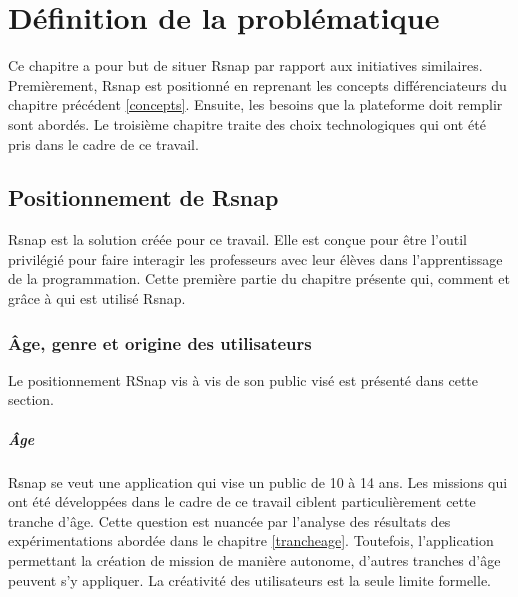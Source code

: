 \chapter{Définition de la problématique}
Ce chapitre a pour but de situer Rsnap par rapport aux initiatives similaires. Premièrement, Rsnap est positionné en reprenant les concepts différenciateurs du chapitre précédent \ref{concepts}. Ensuite, les besoins que la plateforme doit remplir sont abordés. Le troisième chapitre traite des choix technologiques qui ont été pris dans le cadre de ce travail.

\section{Positionnement de Rsnap}
\label{positionnement}
Rsnap est la solution créée pour ce travail. Elle est conçue pour être l'outil privilégié pour faire interagir les professeurs avec leur élèves dans l'apprentissage de la programmation.
Cette première partie du chapitre présente qui, comment et grâce à qui est utilisé Rsnap.


% 

\subsection{Âge, genre et origine des utilisateurs}
Le positionnement RSnap vis à vis de son public visé est présenté dans cette section.

\paragraph{Âge}
Rsnap se veut une application qui vise un public de 10 à 14 ans. Les missions qui ont été développées dans le cadre de ce travail ciblent particulièrement cette tranche d'âge. Cette question est nuancée par l'analyse des résultats des expérimentations abordée dans le chapitre \ref{trancheage}.
Toutefois, l'application permettant la création de mission de manière autonome, d'autres tranches d'âge peuvent s'y appliquer. La créativité des utilisateurs est la seule limite formelle.

